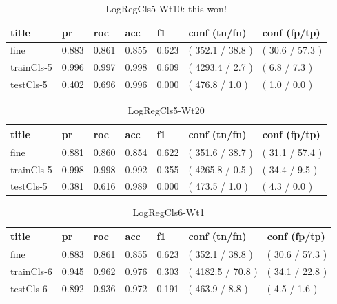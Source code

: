 \documentclass[ms]{nuthesis}
\begin{document}
\FloatBarrier
\begin{table}[H]
\centering
\begin{tabular}{|l||l||l||l||l||l||l|}\toprule
title & pr & roc & acc & f1 & conf (tn/fn) & conf (fp/tp) \\ \midrule
fine & 0.883 & 0.861 & 0.855 & 0.623 & ( 352.1 / 38.8 ) & ( 30.6 / 57.3 ) \\
trainCls-5 & 0.996 & 0.997 & 0.998 & 0.609 & ( 4293.4 / 2.7 ) & ( 6.8 / 7.3 ) \\
testCls-5 & 0.402 & 0.696 & 0.996 & 0.000 & ( 476.8 / 1.0 ) & ( 1.0 / 0.0 ) \\ \bottomrule
\end{tabular}
\caption{LogRegCls5-Wt10: this won!}
\label{tab:LogRegCls5-Wt10}
\end{table}
\FloatBarrier

\FloatBarrier
\begin{table}[H]
\centering
\begin{tabular}{|l||l||l||l||l||l||l|}\toprule
title & pr & roc & acc & f1 & conf (tn/fn) & conf (fp/tp) \\ \midrule
fine & 0.881 & 0.860 & 0.854 & 0.622 & ( 351.6 / 38.7 ) & ( 31.1 / 57.4 ) \\
trainCls-5 & 0.998 & 0.998 & 0.992 & 0.355 & ( 4265.8 / 0.5 ) & ( 34.4 / 9.5 ) \\
testCls-5 & 0.381 & 0.616 & 0.989 & 0.000 & ( 473.5 / 1.0 ) & ( 4.3 / 0.0 ) \\ \bottomrule
\end{tabular}
\caption{LogRegCls5-Wt20}
\label{tab:LogRegCls5-Wt20}
\end{table}
\FloatBarrier


\FloatBarrier
\begin{table}[H]
\centering
\begin{tabular}{|l||l||l||l||l||l||l|}\toprule
title & pr & roc & acc & f1 & conf (tn/fn) & conf (fp/tp) \\ \midrule
fine & 0.883 & 0.861 & 0.855 & 0.623 & ( 352.1 / 38.8 ) & ( 30.6 / 57.3 ) \\
trainCls-6 & 0.945 & 0.962 & 0.976 & 0.303 & ( 4182.5 / 70.8 ) & ( 34.1 / 22.8 ) \\
testCls-6 & 0.892 & 0.936 & 0.972 & 0.191 & ( 463.9 / 8.8 ) & ( 4.5 / 1.6 ) \\ \bottomrule
\end{tabular}
\caption{LogRegCls6-Wt1}
\label{tab:LogRegCls6-Wt1}
\end{table}
\FloatBarrier
\end{document}
